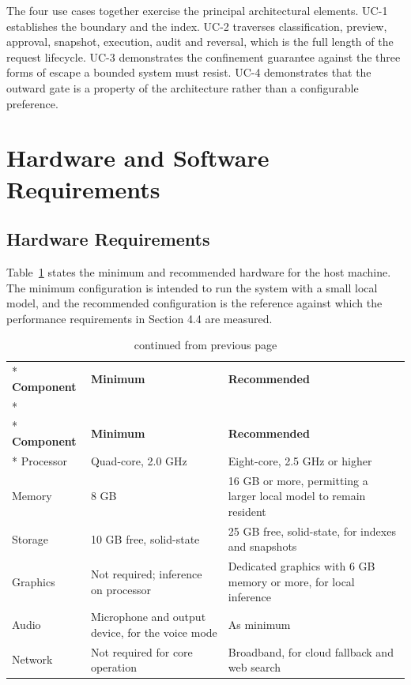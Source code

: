 \documentclass{FastFyp}
\begin{document}
The four use cases together exercise the principal architectural elements. UC-1 establishes the boundary and the index. UC-2 traverses classification, preview, approval, snapshot, execution, audit and reversal, which is the full length of the request lifecycle. UC-3 demonstrates the confinement guarantee against the three forms of escape a bounded system must resist. UC-4 demonstrates that the outward gate is a property of the architecture rather than a configurable preference.

\section{Hardware and Software Requirements}
\subsection{Hardware Requirements}
Table~\ref{tab:hardware} states the minimum and recommended hardware for the host machine. The minimum configuration is intended to run the system with a small local model, and the recommended configuration is the reference against which the performance requirements in Section 4.4 are measured.

{
\begin{longtable}{|p{3.4cm}|p{4.8cm}|p{5.4cm}|}
\caption{Host hardware requirements.}\label{tab:hardware}\\*
\hline
\textbf{Component} & \textbf{Minimum} & \textbf{Recommended} \\*
\hline
\endfirsthead
\caption[]{continued from previous page}\\*
\hline
\textbf{Component} & \textbf{Minimum} & \textbf{Recommended} \\*
\hline
\endhead
\hline
Processor & Quad-core, 2.0 GHz & Eight-core, 2.5 GHz or higher \\
\hline
Memory & 8 GB & 16 GB or more, permitting a larger local model to remain resident \\
\hline
Storage & 10 GB free, solid-state & 25 GB free, solid-state, for indexes and snapshots \\
\hline
Graphics & Not required; inference on processor & Dedicated graphics with 6 GB memory or more, for local inference \\
\hline
Audio & Microphone and output device, for the voice mode & As minimum \\
\hline
Network & Not required for core operation & Broadband, for cloud fallback and web search \\
\hline
\end{longtable}
}
\end{document}
